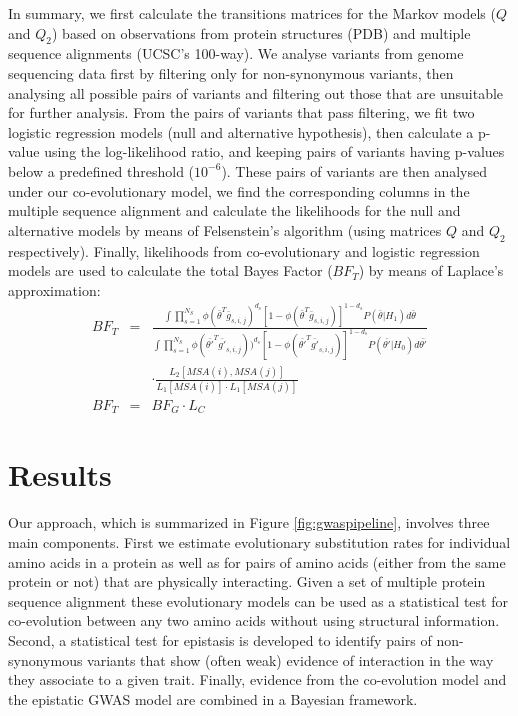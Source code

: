 In summary, we first calculate the transitions matrices for the Markov models ($Q$ and $Q_2$) based on observations from protein structures (PDB) and multiple sequence alignments (UCSC's 100-way). 
We analyse variants from genome sequencing data first by filtering only for non-synonymous variants, then analysing all possible pairs of variants and filtering out those that are unsuitable for further analysis.
From the pairs of variants that pass filtering, we fit two logistic regression models (null and alternative hypothesis), then calculate a p-value using the log-likelihood ratio, and keeping pairs of variants having p-values below a predefined threshold ($10^{-6}$). 
These pairs of variants are then analysed under our co-evolutionary model, we find the corresponding columns in the multiple sequence alignment and calculate the likelihoods for the null and alternative models by means of Felsenstein's algorithm (using matrices $Q$ and $Q_2$ respectively). 
Finally, likelihoods from co-evolutionary and logistic regression models are used to calculate the total Bayes Factor ($BF_T$) by means of Laplace's approximation:
\begin{eqnarray*}\label{eq:bftot}
	BF_T & = & \frac
	{ \int{ \prod_{s=1}^{N_S}{ \phi( \bar{\theta}^T \bar{g}_{s,i,j})^{d_s} [ 1-\phi( \bar{\theta}^T \bar{g}_{s,i,j}) ]^{1-d_s} } P( \bar{\theta} | H_1)  d\bar{\theta} } }
	{ \int{ \prod_{s=1}^{N_S}{ 
	\phi( \bar{\theta'}^T \bar{g'}_{s,i,j} ) )^{d_s} 
	[ 1-\phi( \bar{\theta'}^T \bar{g'}_{s,i,j}) ]^{1-d_s} } 
	P( \bar{\theta'} | H_0)  
	d\bar{\theta'} } } \\
	& & \cdot \frac{L_2[ MSA(i), MSA(j) ]}{L_1[MSA(i)] \cdot L_1[MSA(j)]} \\
	BF_T & = & BF_G \cdot L_C
\end{eqnarray*}

\section{Results}

Our approach, which is summarized in Figure \ref{fig:gwaspipeline}, involves three main components. 
First we estimate evolutionary substitution rates for individual amino acids in a protein as well as for pairs of amino acids (either from the same protein or not) that are physically interacting.
Given a set of multiple protein sequence alignment these evolutionary models can be used as a statistical test for co-evolution between any two amino acids without using structural information. 
Second, a statistical test for epistasis is developed to identify pairs of non-synonymous variants that show (often weak) evidence of interaction in the way they associate to a given trait. 
Finally, evidence from the co-evolution model and the epistatic GWAS model are combined in a Bayesian framework.
 
